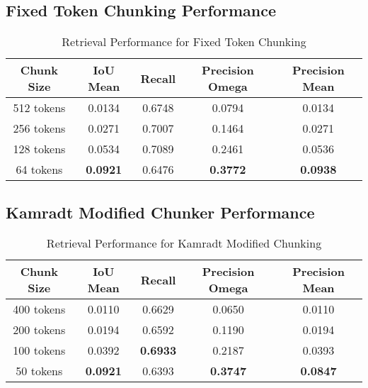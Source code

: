 \documentclass[a4paper,12pt]{article}
\begin{document}
\subsection{Fixed Token Chunking Performance}

\begin{table}[H]
\centering
\caption{Retrieval Performance for Fixed Token Chunking}
\begin{tabular}{ccccc}
\toprule
\textbf{Chunk Size} & \textbf{IoU Mean} & \textbf{Recall} & \textbf{Precision Omega} & \textbf{Precision Mean} \\
\midrule
512 tokens  & 0.0134 & 0.6748 & 0.0794  & 0.0134 \\
256 tokens  & 0.0271 & 0.7007 & 0.1464  & 0.0271 \\
128 tokens  & 0.0534 & 0.7089 & 0.2461  & 0.0536 \\
64 tokens   & \textbf{0.0921} & 0.6476 & \textbf{0.3772} & \textbf{0.0938} \\
\bottomrule
\end{tabular}
\end{table}

\subsection{Kamradt Modified Chunker Performance}

\begin{table}[H]
\centering
\caption{Retrieval Performance for Kamradt Modified Chunking}
\begin{tabular}{ccccc}
\toprule
\textbf{Chunk Size} & \textbf{IoU Mean} & \textbf{Recall} & \textbf{Precision Omega} & \textbf{Precision Mean} \\
\midrule
400 tokens  & 0.0110 & 0.6629 & 0.0650  & 0.0110 \\
200 tokens  & 0.0194 & 0.6592 & 0.1190  & 0.0194 \\
100 tokens  & 0.0392 & \textbf{0.6933} & 0.2187  & 0.0393 \\
50 tokens   & \textbf{0.0921} & 0.6393 & \textbf{0.3747} & \textbf{0.0847} \\
\bottomrule
\end{tabular}
\end{table}
\end{document}
